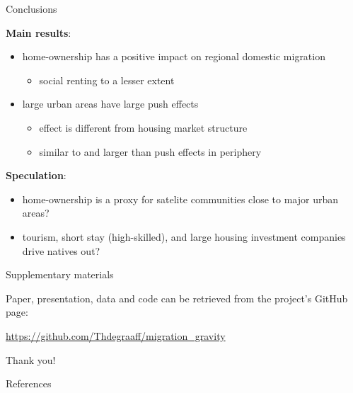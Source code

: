 \documentclass{beamer}
\begin{document}
\begin{frame}{Conclusions}

\textbf{Main results}:
\begin{itemize}
  \item home-ownership has a \alert{positive} impact on regional domestic migration
  \begin{itemize}
	\item social renting to a lesser extent
  \end{itemize}
  \item large urban areas have large \alert{push} effects
  \begin{itemize}
	\item effect is different from housing market structure 
	\item \alert{similar} to and \alert{larger} than push effects in periphery
  \end{itemize}
\end{itemize}

\textbf{Speculation}:
\begin{itemize}
  \item home-ownership is a proxy for satelite communities close to major urban areas?
  \item tourism, short stay (high-skilled), and large housing investment companies drive natives out?
\end{itemize}
\end{frame}

\begin{frame}{Supplementary materials}

Paper, presentation, data and code can be retrieved from the project's GitHub page: 

\begin{center}\url{https://github.com/Thdegraaff/migration\_gravity}\end{center}

\end{frame}

\begin{frame}[standout]
Thank you!
\end{frame}

\appendix

\begin{frame}[allowframebreaks]{References}

		\printbibliography[heading=none]

\end{frame}
\end{document}
